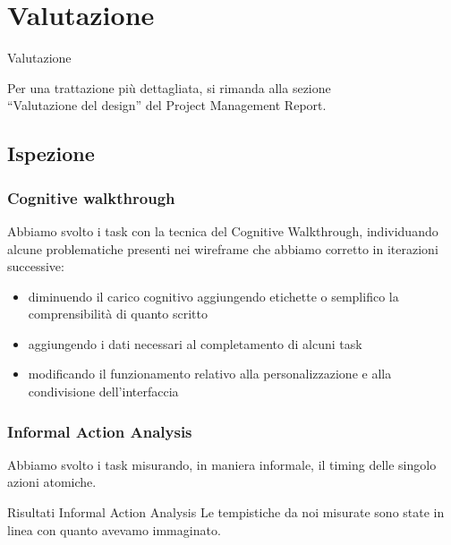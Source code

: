 \documentclass[handout]{beamer}
\begin{document}
	\section{Valutazione}
		\begin{frame}
			\centering
			\begin{Huge}
				Valutazione
			\end{Huge}
			\mbox{}
			\vfill
			\vspace*{100px}
			\begin{scriptsize}
				Per una trattazione più dettagliata, si rimanda alla sezione\\``Valutazione del design'' del Project Management Report.
			\end{scriptsize}
		\end{frame}
		\subsection{Ispezione}
		\begin{frame}
			\frametitle{Cognitive walkthrough}
			Abbiamo svolto i task con la tecnica del Cognitive Walkthrough, individuando alcune problematiche presenti nei wireframe che abbiamo corretto in iterazioni successive:
			\begin{itemize}[<+->]
				\item diminuendo il carico cognitivo aggiungendo etichette o semplifico la comprensibilità di quanto scritto\\
				\item aggiungendo i dati necessari al completamento di alcuni task\\
				\item modificando il funzionamento relativo alla personalizzazione e alla condivisione dell'interfaccia\\
			\end{itemize}
		\end{frame}

		\begin{frame}
			\frametitle{Informal Action Analysis}
			Abbiamo svolto i task misurando, in maniera informale, il timing delle singolo azioni atomiche. \newline \newline
			\begin{block}{Risultati Informal Action Analysis}
			Le tempistiche da noi misurate sono state in linea con quanto avevamo immaginato.
		\end{block}
		\end{frame}
\end{document}
